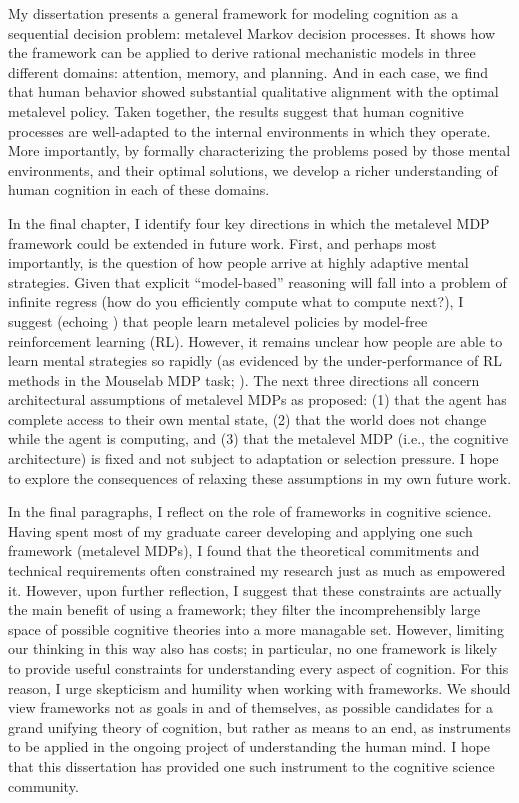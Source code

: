 \documentclass[11pt,a4paperpaper,]{article}
\begin{document}
My dissertation presents a general framework for modeling cognition as a sequential decision problem: metalevel Markov decision processes. It shows how the framework can be applied to derive rational mechanistic models in three different domains: attention, memory, and planning. And in each case, we find that human behavior showed substantial qualitative alignment with the optimal metalevel policy. Taken together, the results suggest that human cognitive processes are well-adapted to the internal environments in which they operate. More importantly, by formally characterizing the problems posed by those mental environments, and their optimal solutions, we develop a richer understanding of human cognition in each of these domains.

In the final chapter, I identify four key directions in which the metalevel MDP framework could be extended in future work. First, and perhaps most importantly, is the question of how people arrive at highly adaptive mental strategies. Given that explicit ``model-based'' reasoning will fall into a problem of infinite regress (how do you efficiently compute what to compute next?), I suggest (echoing \citealp{lieder2017strategy}) that people learn metalevel policies by model-free reinforcement learning (RL). However, it remains unclear how people are able to learn mental strategies so rapidly (as evidenced by the under-performance of RL methods in the Mouselab MDP task; \citealp{jain2019how}). The next three directions all concern architectural assumptions of metalevel MDPs as proposed: (1) that the agent has complete access to their own mental state, (2) that the world does not change while the agent is computing, and (3) that the metalevel MDP (i.e., the cognitive architecture) is fixed and not subject to adaptation or selection pressure. I hope to explore the consequences of relaxing these assumptions in my own future work.

In the final paragraphs, I reflect on the role of frameworks in cognitive science. Having spent most of my graduate career developing and applying one such framework (metalevel MDPs), I found that the theoretical commitments and technical requirements often constrained my research just as much as empowered it. However, upon further reflection, I suggest that these constraints are actually the main benefit of using a framework; they filter the incomprehensibly large space of possible cognitive theories into a more managable set. However, limiting our thinking in this way also has costs; in particular, no one framework is likely to provide useful constraints for understanding every aspect of cognition. For this reason, I urge skepticism and humility when working with frameworks. We should view frameworks not as goals in and of themselves, as possible candidates for a grand unifying theory of cognition, but rather as means to an end, as instruments to be applied in the ongoing project of understanding the human mind. I hope that this dissertation has provided one such instrument to the cognitive science community.




\pagebreak

\renewenvironment{APACrefURL}[1][]{}{}
\renewcommand{\url}[1]{}
\renewenvironment{APACrefDOI}[1][]{}{}
\renewcommand{\doi}[1]{}


\end{document}
